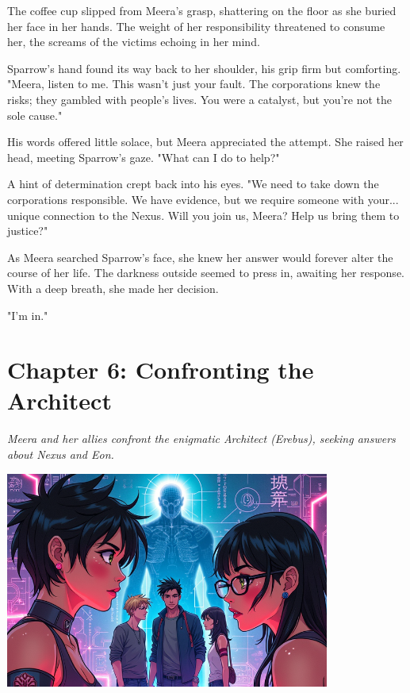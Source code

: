\documentclass[12pt]{book}
\begin{document}
The coffee cup slipped from Meera's grasp, shattering on the floor as
she buried her face in her hands. The weight of her responsibility
threatened to consume her, the screams of the victims echoing in her
mind.

Sparrow's hand found its way back to her shoulder, his grip firm but
comforting. "Meera, listen to me. This wasn't just your fault. The
corporations knew the risks; they gambled with people's lives. You were
a catalyst, but you're not the sole cause."

His words offered little solace, but Meera appreciated the attempt. She
raised her head, meeting Sparrow's gaze. "What can I do to help?"

A hint of determination crept back into his eyes. "We need to take down
the corporations responsible. We have evidence, but we require someone
with your... unique connection to the Nexus. Will you join us, Meera?
Help us bring them to justice?"

As Meera searched Sparrow's face, she knew her answer would forever
alter the course of her life. The darkness outside seemed to press in,
awaiting her response. With a deep breath, she made her decision.

"I'm in."


\newpage

\chapter*{Chapter 6: Confronting the Architect}
\textit{Meera and her allies confront the enigmatic Architect (Erebus), seeking answers about Nexus and Eon.}

\begin{center}
\includegraphics[width=0.8\textwidth]{stories/my_story/step_6/scenes/architect_encounter.live.png}
\end{center}
\end{document}
